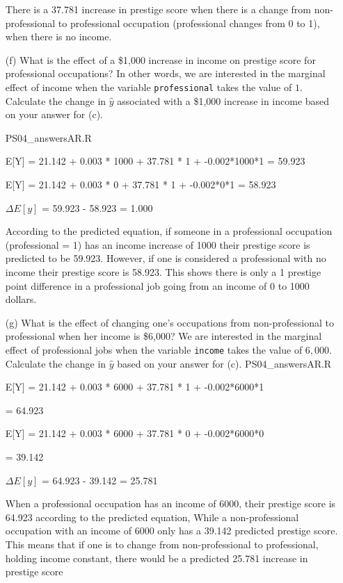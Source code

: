 \documentclass[12pt,letterpaper]{article}
\begin{document}
\begin{enumerate}
	There is a 37.781 increase in prestige score when there is a change from non-professional to professional occupation (professional changes from 0 to 1), when there is no income.
	\vspace{.5cm}
\newpage
	\item [(f)]
	What is the effect of a \$1,000 increase in income on prestige score for professional occupations? In other words, we are interested in the marginal effect of income when the variable \texttt{professional} takes the value of $1$. Calculate the change in $\hat{y}$ associated with a \$1,000 increase in income based on your answer for (c).
	
	 {PS04_answersAR.R}
	\begin{center}
		E[Y] = 21.142 + 0.003 * 1000 + 37.781 * 1 + -0.002*1000*1
			= 59.923
	\end{center}
		\begin{center}
		E[Y] = 21.142 + 0.003 * 0 + 37.781 * 1 + -0.002*0*1
			= 58.923
	\end{center}
	\begin{center}
		$\Delta{E[y]}$ = 59.923 - 58.923
		= 1.000
	\end{center}
	
	According to the predicted equation, if someone in a professional occupation (professional = 1) has an income increase of 1000 their prestige score is predicted to be 59.923. However, if one is considered a professional with no income their prestige score is 58.923. This shows there is only a 1 prestige point difference in a professional job going from an income of 0 to 1000 dollars.
	\newpage
	\item [(g)]
	What is the effect of changing one's occupations from non-professional to professional when her income is \$6,000? We are interested in the marginal effect of professional jobs when the variable \texttt{income} takes the value of $6,000$. Calculate the change in $\hat{y}$ based on your answer for (c).
	 {PS04_answersAR.R}
		\begin{center}
		E[Y] = 21.142 + 0.003 * 6000 + 37.781 * 1 + -0.002*6000*1
		
	 		= 64.923
		\end{center}
	\begin{center}
		E[Y] = 21.142 + 0.003 * 6000 + 37.781 * 0 + -0.002*6000*0
		
			= 39.142
	\end{center}
	\begin{center}
		$\Delta{E[y]}$ = 64.923 - 39.142
					= 25.781
	\end{center}
	When a professional occupation has an income of 6000, their prestige score is 64.923 according to the predicted equation, 
	While a non-professional occupation with an income of 6000 only has a 39.142 predicted prestige score. 
	This means that if one is to change from non-professional to professional, holding income constant, there would be a predicted 25.781 increase in prestige score
	
\end{enumerate}
\end{document}
